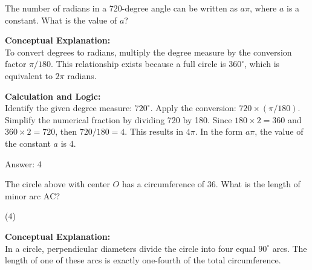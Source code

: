 \documentclass[11pt,paper=a4,answers]{exam}
\begin{document}
\begin{questions}
\vspace{60pt}

\question
The number of radians in a 720-degree angle can be written as $a\pi$, where $a$ is a constant. What is the value of $a$?

\begin{solution}
\textbf{Conceptual Explanation:} \\
To convert degrees to radians, multiply the degree measure by the conversion factor $\pi / 180$. This relationship exists because a full circle is $360^\circ$, which is equivalent to $2\pi$ radians.

\vspace{30pt}

\textbf{Calculation and Logic:} \\
Identify the given degree measure: $720^\circ$. Apply the conversion: $720 \times (\pi / 180)$. Simplify the numerical fraction by dividing 720 by 180. Since $180 \times 2 = 360$ and $360 \times 2 = 720$, then $720 / 180 = 4$. This results in $4\pi$. In the form $a\pi$, the value of the constant $a$ is 4.

\vspace{30pt}

Answer: \colorbox{yellow!100}{4}
\end{solution}

\vspace{60pt}

\question
\begin{center}
\end{center}
The circle above with center $O$ has a circumference of 36. What is the length of minor arc $\text{AC}$?
\begin{tasks}(4)
\end{tasks}

\begin{solution}
\textbf{Conceptual Explanation:} \\
In a circle, perpendicular diameters divide the circle into four equal $90^\circ$ arcs. The length of one of these arcs is exactly one-fourth of the total circumference.


\end{solution}
\end{questions}
\end{document}

